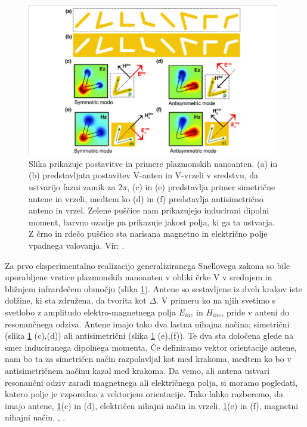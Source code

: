 \documentclass[12pt ]{article}
\begin{document}
 \begin{figure}[H]
     \centering
     \includegraphics[width=11cm, height=6.7cm]{Slike/Antenna.png}
     \caption{Slika prikazuje postavitve in primere plazmonskih nanoanten. (a) in (b) predstavljata postavitev V-anten in V-vrzeli v sredstvu, da ustvarijo fazni zamik za $2\pi$, (c) in (e) predstavlja primer simetrične antene in vrzeli, medtem ko (d) in (f) predstavlja antisimetrično anteno in vrzel. Zelene puščice nam prikazujejo inducirani dipolni moment, barvno ozadje pa prikazuje jakost polja, ki ga ta ustvarja. Z črno in rdečo puščico sta narisana magnetno in električno polje vpadnega valovanja. Vir: \cite{Antena}. }
     \label{Antena}
 \end{figure}
 
Za prvo eksperimentalno realizacijo generaliziranega Snellovega zakona so bile uporabljene vrstice plazmonskih nanoanten v obliki črke V v srednjem in bližnjem infrardečem območju (slika \ref{Antena}). Antene so sestavljene iz dveh krakov iste dolžine, ki sta združena, da tvorita kot $\Delta$. V primeru ko na njih svetimo s svetlobo z amplitudo elektro-magnetnega polja $E_{inc}$ in $H_{inc}$, pride v anteni do resonančnega odziva.  Antene imajo tako dva lastna nihajna načina; simetrični (slika \ref{Antena} (c),(d)) ali antisimetrični (slika \ref{Antena} (e),(f)). Te dva sta določena glede na smer induciranega dipolnega momenta. Če definiramo vektor orientacije antene, nam bo ta za simetričen način razpolavljal kot med krakoma, medtem ko bo v antisimetričnem načinu kazal med krakoma. Da vemo, ali antena ustvari resonančni odziv zaradi magnetnega ali električnega polja, si moramo pogledati, katero polje je vzporedno z vektorjem orientacije. Tako lahko razberemo, da imajo antene, \ref{Antena}(c) in (d), električen nihajni način in vrzeli, \ref{Antena}(e) in (f), magnetni nihajni način.  \cite{Antena}, \cite{Snell}.
\end{document}
